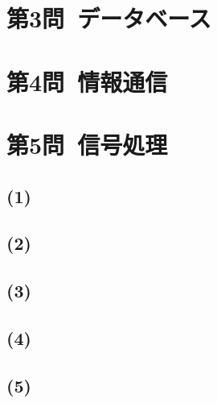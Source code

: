 \documentclass[a4paper,12pt,xelatex,ja=standard]{bxjsarticle}
\begin{document}
\section*{第3問\ データベース}

\section*{第4問\ 情報通信}

\section*{第5問\ 信号処理}
\subsection*{(1)}

\subsection*{(2)}

\subsection*{(3)}

\subsection*{(4)}

\subsection*{(5)}
\end{document}
